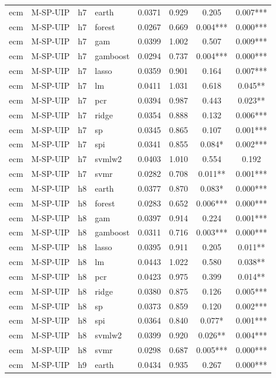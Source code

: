 \begin{ThreePartTable}
\begin{longtable}[t]{llclcccc}
\addlinespace
ecm & M-SP-UIP & h7 & earth & 0.0371 & 0.929 & 0.205 & 0.007***\\
ecm & M-SP-UIP & h7 & forest & 0.0267 & 0.669 & 0.004*** & 0.000***\\
ecm & M-SP-UIP & h7 & gam & 0.0399 & 1.002 & 0.507 & 0.009***\\
ecm & M-SP-UIP & h7 & gamboost & 0.0294 & 0.737 & 0.004*** & 0.000***\\
ecm & M-SP-UIP & h7 & lasso & 0.0359 & 0.901 & 0.164 & 0.007***\\
ecm & M-SP-UIP & h7 & lm & 0.0411 & 1.031 & 0.618 & 0.045**\\
ecm & M-SP-UIP & h7 & pcr & 0.0394 & 0.987 & 0.443 & 0.023**\\
ecm & M-SP-UIP & h7 & ridge & 0.0354 & 0.888 & 0.132 & 0.006***\\
ecm & M-SP-UIP & h7 & sp & 0.0345 & 0.865 & 0.107 & 0.001***\\
ecm & M-SP-UIP & h7 & spi & 0.0341 & 0.855 & 0.084* & 0.002***\\
ecm & M-SP-UIP & h7 & svmlw2 & 0.0403 & 1.010 & 0.554 & 0.192\\
ecm & M-SP-UIP & h7 & svmr & 0.0282 & 0.708 & 0.011** & 0.001***\\
\addlinespace
ecm & M-SP-UIP & h8 & earth & 0.0377 & 0.870 & 0.083* & 0.000***\\
ecm & M-SP-UIP & h8 & forest & 0.0283 & 0.652 & 0.006*** & 0.000***\\
ecm & M-SP-UIP & h8 & gam & 0.0397 & 0.914 & 0.224 & 0.001***\\
ecm & M-SP-UIP & h8 & gamboost & 0.0311 & 0.716 & 0.003*** & 0.000***\\
ecm & M-SP-UIP & h8 & lasso & 0.0395 & 0.911 & 0.205 & 0.011**\\
ecm & M-SP-UIP & h8 & lm & 0.0443 & 1.022 & 0.580 & 0.038**\\
ecm & M-SP-UIP & h8 & pcr & 0.0423 & 0.975 & 0.399 & 0.014**\\
ecm & M-SP-UIP & h8 & ridge & 0.0380 & 0.875 & 0.126 & 0.005***\\
ecm & M-SP-UIP & h8 & sp & 0.0373 & 0.859 & 0.120 & 0.002***\\
ecm & M-SP-UIP & h8 & spi & 0.0364 & 0.840 & 0.077* & 0.001***\\
ecm & M-SP-UIP & h8 & svmlw2 & 0.0399 & 0.920 & 0.026** & 0.004***\\
ecm & M-SP-UIP & h8 & svmr & 0.0298 & 0.687 & 0.005*** & 0.000***\\
\addlinespace
ecm & M-SP-UIP & h9 & earth & 0.0434 & 0.935 & 0.267 & 0.000***\\

\end{longtable}
\end{ThreePartTable}
